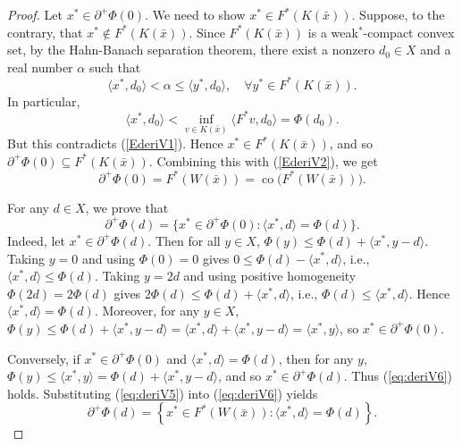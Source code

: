 \documentclass[11pt]{article}
\begin{document}
\begin{proof}
	Let $x^* \in \partial^+ \Phi(0)$. We need to show $x^* \in F^*(K(\bar{x}))$. Suppose, to the contrary, that $x^* \notin F^*(K(\bar{x}))$. Since $F^*(K(\bar{x}))$ is a weak$^*$-compact convex set,  by the Hahn-Banach separation theorem,  there exist a nonzero $d_0 \in X$ and a real number $\alpha$ such that
	\[
	\langle x^*, d_0 \rangle < \alpha \le \langle y^*, d_0 \rangle, \quad \forall y^* \in F^*(K(\bar{x})).
	\]
	In particular,
	\[
	\langle x^*, d_0 \rangle < \inf_{v \in K(\bar{x})} \langle F^*v, d_0 \rangle = \Phi(d_0).
	\]
	But this contradicts (\ref{EderiV1}). Hence $x^* \in F^*(K(\bar{x}))$, and so  $\partial^+ \Phi(0) \subseteq	 F^*(K(\bar{x})) .$
	 Combining this with (\ref{EderiV2}), we get
	\begin{equation}\label{eq:deriV5}
		\partial^+ \Phi(0) = F^*(W(\bar{x})) = \operatorname{co}\bigl(F^*(W(\bar{x}))\bigr).
	\end{equation}
	
	For   any   $d \in X$, we prove that    
	\begin{equation}\label{eq:deriV6}
		\partial^+ \Phi(d) = \{ x^* \in \partial^+ \Phi(0) : \langle x^*, d \rangle = \Phi(d) \}.
	\end{equation}
	Indeed, let $x^* \in \partial^+ \Phi(d)$. Then for all $y \in X$, $\Phi(y) \le \Phi(d) + \langle x^*, y-d \rangle$. Taking $y=0$ and using $\Phi(0)=0$ gives $0 \le \Phi(d) - \langle x^*, d \rangle$, i.e., $\langle x^*, d \rangle \le \Phi(d)$. Taking $y=2d$ and using positive homogeneity $\Phi(2d)=2\Phi(d)$ gives $2\Phi(d) \le \Phi(d) + \langle x^*, d \rangle$, i.e., $\Phi(d) \le \langle x^*, d \rangle$. Hence $\langle x^*, d \rangle = \Phi(d)$. Moreover, for any $y \in X$, $\Phi(y) \le \Phi(d) + \langle x^*, y-d \rangle = \langle x^*, d \rangle + \langle x^*, y-d \rangle = \langle x^*, y \rangle$, so $x^* \in \partial^+ \Phi(0)$.
	
	Conversely, if $x^* \in \partial^+ \Phi(0)$ and $\langle x^*, d \rangle = \Phi(d)$, then for any $y$, $\Phi(y) \le \langle x^*, y \rangle = \Phi(d) + \langle x^*, y-d \rangle$,   and so $x^* \in \partial^+ \Phi(d)$.
	Thus (\ref{eq:deriV6}) holds.
		Substituting (\ref{eq:deriV5}) into (\ref{eq:deriV6}) yields
	\[
	\partial^+ \Phi(d) = \left\{ x^* \in F^*(W(\bar{x})) : \langle x^*, d \rangle = \Phi(d) \right\}.
	\]
\end{proof}
\end{document}
